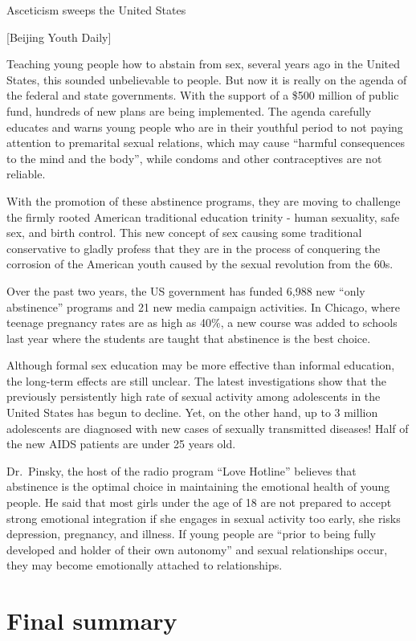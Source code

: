 \documentclass[
]{book}
\begin{document}
Asceticism sweeps the United States

{[}Beijing Youth Daily{]}

Teaching young people how to abstain from sex, several years ago in the United States, this sounded unbelievable to people. But now it is really on the agenda of the federal and state governments. With the support of a \$500 million of public fund, hundreds of new plans are being implemented. The agenda carefully educates and warns young people who are in their youthful period to not paying attention to premarital sexual relations, which may cause ``harmful consequences to the mind and the body'', while condoms and other contraceptives are not reliable.

With the promotion of these abstinence programs, they are moving to challenge the firmly rooted American traditional education trinity - human sexuality, safe sex, and birth control. This new concept of sex causing some traditional conservative to gladly profess that they are in the process of conquering the corrosion of the American youth caused by the sexual revolution from the 60s.

Over the past two years, the US government has funded 6,988 new ``only abstinence'' programs and 21 new media campaign activities. In Chicago, where teenage pregnancy rates are as high as 40\%, a new course was added to schools last year where the students are taught that abstinence is the best choice.

Although formal sex education may be more effective than informal education, the long-term effects are still unclear. The latest investigations show that the previously persistently high rate of sexual activity among adolescents in the United States has begun to decline. Yet, on the other hand, up to 3 million adolescents are diagnosed with new cases of sexually transmitted diseases! Half of the new AIDS patients are under 25 years old.

Dr.~Pinsky, the host of the radio program ``Love Hotline'' believes that abstinence is the optimal choice in maintaining the emotional health of young people. He said that most girls under the age of 18 are not prepared to accept strong emotional integration if she engages in sexual activity too early, she risks depression, pregnancy, and illness. If young people are ``prior to being fully developed and holder of their own autonomy'' and sexual relationships occur, they may become emotionally attached to relationships.

\hypertarget{final-summary-2}{%
\section{Final summary}\label{final-summary-2}}
\end{document}
